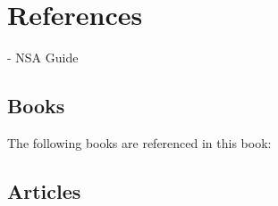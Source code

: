 \chapter{References}

  - NSA Guide


\section{Books}\label{section:books}
The following books are referenced in this book:

\printbibliography[heading=bibempty,type=book]

\cite{carrier-file-systems}
\section{Articles}


